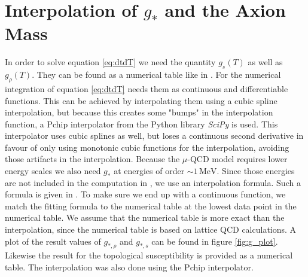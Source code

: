 \documentclass[twoside,a4paper, 12pt]{article}
\numberwithin{equation}{section}
\begin{document}
\section{Interpolation of $g_*$ and the Axion Mass}
\label{sec:g}
In order to solve equation \eqref{eq:dtdT} we need the quantity $g_s(T)$ as well as $g_\rho(T)$. They can be found as a numerical table like in \cite[Table S2]{LatticQCD4Cosmo}.
For the numerical integration of equation \eqref{eq:dtdT} needs them as continuous and differentiable
functions. This can be achieved by interpolating them using a cubic spline interpolation, but because this creates
some "bumps" in the interpolation function, a Pchip interpolator from the Python library \textit{SciPy} is used. This interpolator uses cubic splines as well, but loses a continuous second derivative in favour of only using monotonic cubic functions for the interpolation, avoiding those artifacts in the interpolation.
Because the $\mu$-QCD model requires lower energy scales
we also need $g_*$ at energies of order $\sim 1 \, \mathrm{MeV}$. Since those energies are not included in the
computation in \cite{LatticQCD4Cosmo}, we use an interpolation formula.
Such a formula is given in \cite[Appendix A]{AxionCosmoRev}.
To make sure we end up with a continuous function, we match
the fitting formula to the numerical table at the
lowest data point in the numerical table.
We assume that the numerical table is more exact than the
interpolation, since the numerical table is based on 
lattice QCD calculations.
A plot of the result values of $g_{*, \rho}$ and $g_{*, s}$ can be 
found in figure \ref{fig:g_plot}.
Likewise the result for the topological susceptibility is provided as a 
numerical table.
The interpolation was also done using the Pchip interpolator.
\end{document}
